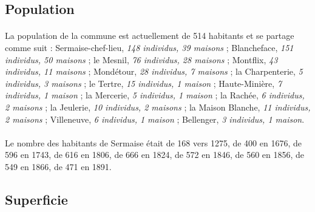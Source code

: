 \documentclass[../eBook.tex]{subfiles}
\begin{document}
  \subsection*{Population}
    \paragraph{}La population de la commune est actuellement de 514 habitants et se partage comme suit : Sermaise-chef-lieu, \textit{148 individus, 39 maisons} ; Blancheface, \textit{151 individus, 50 maisons} ; le Mesnil, \textit{76 individus, 28 maisons} ; Montflix, \textit{43 individus, 11 maisons} ; Mondétour, \textit{28 individus, 7 maisons} ; la Charpenterie, \textit{5 individus, 3 maisons} ; le Tertre, \textit{15 individus, 1 maison} ; Haute-Minière, \textit{7 individus, 1 maison} ; la Mercerie, \textit{5 individus, 1 maison} ; la Rachée, \textit{6 individus, 2 maisons} ; la Jeulerie, \textit{10 individus, 2 maisons} ; la Maison Blanche, \textit{11 individus, 2 maisons} ; Villeneuve, \textit{6 individus, 1 maison} ; Bellenger, \textit{3 individus, 1 maison}.
    \paragraph{}Le nombre des habitants de Sermaise était de 168 vers 1275, de 400 en 1676, de 596 en 1743, de 616 en 1806, de 666 en 1824, de 572 en 1846, de 560 en 1856, de 549 en 1866, de 471 en 1891.

  \subsection*{Superficie}
\end{document}
